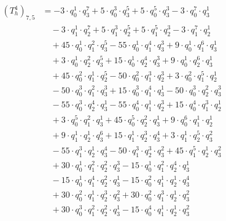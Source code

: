 \begin{align*}(T_{h}^4)_{7,5}&=-3\cdot q_0^{1}\cdot q_3^{7}+5\cdot q_0^{3}\cdot q_3^{5}+5\cdot q_0^{5}\cdot q_3^{3}-3\cdot q_0^{7}\cdot q_3^{1}\\
&\quad -3\cdot q_1^{1}\cdot q_2^{7}+5\cdot q_1^{3}\cdot q_2^{5}+5\cdot q_1^{5}\cdot q_2^{3}-3\cdot q_1^{7}\cdot q_2^{1}\\
&\quad +45\cdot q_0^{1}\cdot q_1^{2}\cdot q_3^{5}-55\cdot q_0^{1}\cdot q_1^{4}\cdot q_3^{3}+9\cdot q_0^{1}\cdot q_1^{6}\cdot q_3^{1}\\
&\quad +3\cdot q_0^{1}\cdot q_2^{2}\cdot q_3^{5}+15\cdot q_0^{1}\cdot q_2^{4}\cdot q_3^{3}+9\cdot q_0^{1}\cdot q_2^{6}\cdot q_3^{1}\\
&\quad +45\cdot q_0^{2}\cdot q_1^{1}\cdot q_2^{5}-50\cdot q_0^{2}\cdot q_1^{3}\cdot q_2^{3}+3\cdot q_0^{2}\cdot q_1^{5}\cdot q_2^{1}\\
&\quad -50\cdot q_0^{3}\cdot q_1^{2}\cdot q_3^{3}+15\cdot q_0^{3}\cdot q_1^{4}\cdot q_3^{1}-50\cdot q_0^{3}\cdot q_2^{2}\cdot q_3^{3}\\
&\quad -55\cdot q_0^{3}\cdot q_2^{4}\cdot q_3^{1}-55\cdot q_0^{4}\cdot q_1^{1}\cdot q_2^{3}+15\cdot q_0^{4}\cdot q_1^{3}\cdot q_2^{1}\\
&\quad +3\cdot q_0^{5}\cdot q_1^{2}\cdot q_3^{1}+45\cdot q_0^{5}\cdot q_2^{2}\cdot q_3^{1}+9\cdot q_0^{6}\cdot q_1^{1}\cdot q_2^{1}\\
&\quad +9\cdot q_1^{1}\cdot q_2^{1}\cdot q_3^{6}+15\cdot q_1^{1}\cdot q_2^{3}\cdot q_3^{4}+3\cdot q_1^{1}\cdot q_2^{5}\cdot q_3^{2}\\
&\quad -55\cdot q_1^{3}\cdot q_2^{1}\cdot q_3^{4}-50\cdot q_1^{3}\cdot q_2^{3}\cdot q_3^{2}+45\cdot q_1^{5}\cdot q_2^{1}\cdot q_3^{2}\\
&\quad +30\cdot q_0^{1}\cdot q_1^{2}\cdot q_2^{2}\cdot q_3^{3}-15\cdot q_0^{1}\cdot q_1^{2}\cdot q_2^{4}\cdot q_3^{1}\\
&\quad -15\cdot q_0^{1}\cdot q_1^{4}\cdot q_2^{2}\cdot q_3^{1}-15\cdot q_0^{2}\cdot q_1^{1}\cdot q_2^{1}\cdot q_3^{4}\\
&\quad +30\cdot q_0^{2}\cdot q_1^{1}\cdot q_2^{3}\cdot q_3^{2}+30\cdot q_0^{2}\cdot q_1^{3}\cdot q_2^{1}\cdot q_3^{2}\\
&\quad +30\cdot q_0^{3}\cdot q_1^{2}\cdot q_2^{2}\cdot q_3^{1}-15\cdot q_0^{4}\cdot q_1^{1}\cdot q_2^{1}\cdot q_3^{2}\end{align*}
